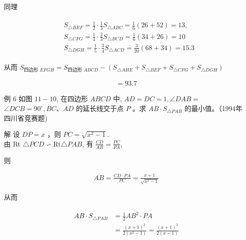 \documentclass[10pt]{article}
\begin{document}
同理

\begin{align*}
\begin{aligned}
& S_{\triangle B E F}=\frac{1}{2} \cdot \frac{1}{3} S_{\triangle A B C}=\frac{1}{6}(26+52)=13, \\
& S_{\triangle C F G}=\frac{1}{4} \cdot \frac{2}{3} S_{\triangle B C D}=\frac{1}{6}(34+26)=10 \\
& S_{\triangle D G H}=\frac{1}{5} \cdot \frac{3}{4} S_{\triangle A C D}=\frac{3}{20}(68+34)=15.3
\end{aligned}
\end{align*}

从而 $S_{\text {四边形 } E F G H}=S_{\text {四边形 } A B C D}-\left(S_{\triangle A H E}+S_{\triangle B E F}+S_{\triangle C F G}+S_{\triangle D G H}\right)$

\begin{align*}
=93.7
\end{align*}

例 6 如图 $11-10$, 在四边形 $A B C D$ 中, $A D=D C=1, \angle D A B=$ $\angle D C B=90^{\circ}, B C 、 A D$ 的延长线交于点 $P$ 。求 $A B \cdot S_{\triangle P A B}$ 的最小值。（1994年四川省竞赛题)

解 设 $D P=x$ ，则 $P C=\sqrt{x^{2}-1}$.\\
由 Rt $\triangle P C D \backsim \mathrm{Rt} \triangle P A B$, 有 $\frac{C D}{A B}=\frac{P C}{P A}$,

则

\begin{align*}
A B=\frac{C D \cdot P A}{P C}=\frac{x+1}{\sqrt{x^{2}-1}}
\end{align*}

从而

\begin{align*}
\begin{aligned}
A B \cdot S_{\triangle P A B} & =\frac{1}{2} A B^{2} \cdot P A \\
& =\frac{(x+1)^{3}}{2\left(x^{2}-1\right)}=\frac{(x+1)^{2}}{2(x-1)}
\end{aligned}
\end{align*}
\end{document}
